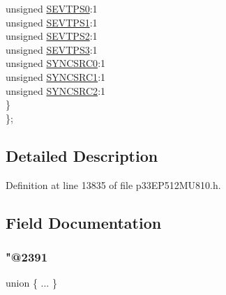 \begin{DoxyCompactItemize}
\begin{tabbing}
\>\>unsigned \hyperlink{structtag_p_t_c_o_n_b_i_t_s_ae16b848b00591ac9565c3828075bb696}{SEVTPS0}:1\\
\>\>unsigned \hyperlink{structtag_p_t_c_o_n_b_i_t_s_a0cd678fed838bbf27fdb25b22cf2ce59}{SEVTPS1}:1\\
\>\>unsigned \hyperlink{structtag_p_t_c_o_n_b_i_t_s_af783ab1e2baf89973d617caf3e1f6997}{SEVTPS2}:1\\
\>\>unsigned \hyperlink{structtag_p_t_c_o_n_b_i_t_s_aeb947332f98d32331d09837c884fa9a1}{SEVTPS3}:1\\
\>\>unsigned \hyperlink{structtag_p_t_c_o_n_b_i_t_s_ac648079988b2735c2cc8f884b447150a}{SYNCSRC0}:1\\
\>\>unsigned \hyperlink{structtag_p_t_c_o_n_b_i_t_s_aeee1112578ba6bcc147b15471e22e0c4}{SYNCSRC1}:1\\
\>\>unsigned \hyperlink{structtag_p_t_c_o_n_b_i_t_s_a510f85838b8ccfa7589c313ef0ab07c2}{SYNCSRC2}:1\\
\>\} \\
\}; \\

\end{tabbing}\end{DoxyCompactItemize}


\subsection{Detailed Description}


Definition at line 13835 of file p33\+E\+P512\+M\+U810.\+h.



\subsection{Field Documentation}
\mbox{\label{structtag_p_t_c_o_n_b_i_t_s_aaa126f5f8c5196fd2cb9baf3cc8493ba}} 
\subsubsection{\texorpdfstring{"@2391}{@2391}}
{\footnotesize\ttfamily union \{ ... \} }

\mbox{\label{structtag_p_t_c_o_n_b_i_t_s_adf71f3d8410c1f1dbbc96680a92c49af}} 
